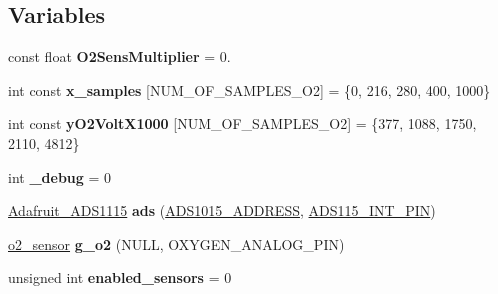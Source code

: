 \subsection*{Variables}
\begin{DoxyCompactItemize}
\item 
\mbox{\label{group___ventilator_module_gae8db0bd3935e57f7c0a5cb3a1480f562}} 
const float {\bfseries O2\+Sens\+Multiplier} = 0.
\item 
\mbox{\label{group___ventilator_module_ga1118fcf36a4236a3247cb971ae47827f}} 
int const {\bfseries x\+\_\+samples} \mbox{[}N\+U\+M\+\_\+\+O\+F\+\_\+\+S\+A\+M\+P\+L\+E\+S\+\_\+\+O2\mbox{]} = \{0, 216, 280, 400, 1000\}
\item 
\mbox{\label{group___ventilator_module_gac308a00f2c7a8bb11c3d43c4d2123820}} 
int const {\bfseries y\+O2\+Volt\+X1000} \mbox{[}N\+U\+M\+\_\+\+O\+F\+\_\+\+S\+A\+M\+P\+L\+E\+S\+\_\+\+O2\mbox{]} = \{377, 1088, 1750, 2110, 4812\}
\item 
\mbox{\label{group___ventilator_module_ga4859ebf3de3eada7338899d0f24d3c23}} 
int {\bfseries \+\_\+debug} = 0
\item 
\mbox{\label{group___ventilator_module_ga7fa901d9c81ed7aad7a744feae2bba55}} 
\hyperlink{class_adafruit___a_d_s1115}{Adafruit\+\_\+\+A\+D\+S1115} {\bfseries ads} (\hyperlink{_adafruit___a_d_s1015_8h_ae55d158023984e8f0ddc80b58d5b30dc}{A\+D\+S1015\+\_\+\+A\+D\+D\+R\+E\+SS}, \hyperlink{pinout_8h_a523b7e982dca567dfe2f8ba0f446c7fd}{A\+D\+S115\+\_\+\+I\+N\+T\+\_\+\+P\+IN})
\item 
\mbox{\label{group___ventilator_module_gaf602bf65bce528448768865be8f7a33d}} 
\hyperlink{classo2__sensor}{o2\+\_\+sensor} {\bfseries g\+\_\+o2} (N\+U\+LL, O\+X\+Y\+G\+E\+N\+\_\+\+A\+N\+A\+L\+O\+G\+\_\+\+P\+IN)
\item 
\mbox{\label{group___ventilator_module_gaab8e9b4eb2902a2691073cc63200f4b8}} 
unsigned int {\bfseries enabled\+\_\+sensors} = 0
\item 
\mbox{\label{group___ventilator_module_gaf951f6e1ff9675b887dab1a77cbd3c36}} 

\end{DoxyCompactItemize}
